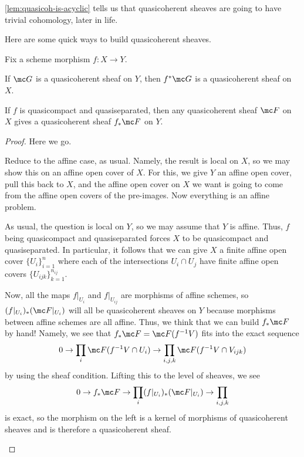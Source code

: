 \documentclass[../notes.tex]{subfiles}
\begin{document}
\begin{remark}
	\autoref{lem:quasicoh-is-acyclic} tells us that quasicoherent sheaves are going to have trivial cohomology, later in life.
\end{remark}
Here are some quick ways to build quasicoherent sheaves.
\begin{proposition}
	Fix a scheme morphism $f\colon X\to Y$.
	\begin{listalph}
		\item If $\mc G$ is a quasicoherent sheaf on $Y$, then $f^*\mc G$ is a quasicoherent sheaf on $X$.
		\item If $f$ is quasicompact and quasiseparated, then any quasicoherent sheaf $\mc F$ on $X$ gives a quasicoherent sheaf $f_*\mc F$ on $Y$.
	\end{listalph}
\end{proposition}
\begin{proof}
	Here we go.
	\begin{listalph}
		\item Reduce to the affine case, as usual. Namely, the result is local on $X$, so we may show this on an affine open cover of $X$. For this, we give $Y$ an affine open cover, pull this back to $X$, and the affine open cover on $X$ we want is going to come from the affine open covers of the pre-images. Now everything is an affine problem.
		\item As usual, the question is local on $Y$, so we may assume that $Y$ is affine. Thus, $f$ being quasicompact and quasiseparated forces $X$ to be quasicompact and quasiseparated. In particular, it follows that we can give $X$ a finite affine open cover $\{U_i\}_{i=1}^n$ where each of the intersections $U_i\cap U_j$ have finite affine open covers $\{U_{ijk}\}_{k=1}^{n_{ij}}$.

		Now, all the maps $f|_{U_i}$ and $f|_{U_{ij}}$ are morphisms of affine schemes, so $(f|_{U_i})_*(\mc F|_{U_i})$ will all be quasicoherent sheaves on $Y$ because morphisms between affine schemes are all affine. Thus, we think that we can build $f_*\mc F$ by hand! Namely, we see that $f_*\mc F=\mc F(f^{-1}V)$ fits into the exact sequence
		\[0\to\prod_i\mc F(f^{-1}V\cap U_i)\to\prod_{i,j,k}\mc F(f^{-1}V\cap V_{ijk})\]
		by using the sheaf condition. Lifting this to the level of sheaves, we see
		\[0\to f_*\mc F\to\prod_i(f|_{U_i})_*(\mc F|_{U_i})\to\prod_{i,j,k}\]
		is exact, so the morphism on the left is a kernel of morphisms of quasicoherent sheaves and is therefore a quasicoherent sheaf.
		\qedhere
	\end{listalph}
\end{proof}
\end{document}
